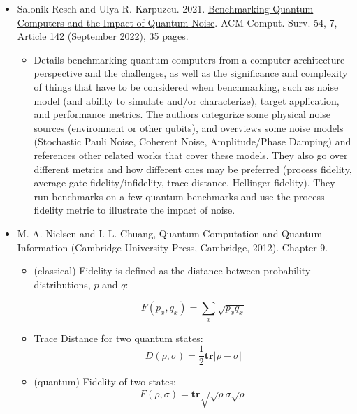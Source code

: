 \documentclass [12pt]{article}
\begin{document}
    \begin{itemize}
        \item Salonik Resch and Ulya R. Karpuzcu. 2021. \href{https://dl-acm-org.ezproxy.library.tufts.edu/doi/10.1145/3464420}{Benchmarking Quantum Computers and the Impact of Quantum Noise}. ACM Comput. Surv. 54, 7, Article 142 (September 2022), 35 pages.
            \begin{itemize}
                \item Details benchmarking quantum computers from a computer architecture perspective and the challenges, as well as the significance and complexity of things that have to be considered when benchmarking, such as noise model (and ability to simulate and/or characterize), target application, and performance metrics. The authors categorize some physical noise sources (environment or other qubits), and overviews some noise models (Stochastic Pauli Noise, Coherent Noise, Amplitude/Phase Damping) and references other related works that cover these models. They also go over different metrics and how different ones may be preferred (process fidelity, average gate fidelity/infidelity, trace distance, Hellinger fidelity). They run benchmarks on a few quantum benchmarks and use the process fidelity metric to illustrate the impact of noise.
            \end{itemize}

        \item M. A. Nielsen and I. L. Chuang, Quantum Computation and Quantum Information (Cambridge University Press, Cambridge, 2012). Chapter 9.
            \begin{itemize}
                \item (classical) Fidelity is defined as the distance between probability distributions, $p$ and $q$: 
                
                $$ F(p_x, q_x) = \sum_x \sqrt{p_x q_x} $$

                \item Trace Distance for two quantum states: 
                $$  D(\rho, \sigma) = \frac{1}{2}\textbf{tr}|\rho - \sigma| $$

                \item (quantum) Fidelity of two states: 
                $$  F(\rho, \sigma) = \textbf{tr} \sqrt{\sqrt{\rho} \sigma \sqrt{\rho}} $$
            \end{itemize}

    \end{itemize}
\end{document}
